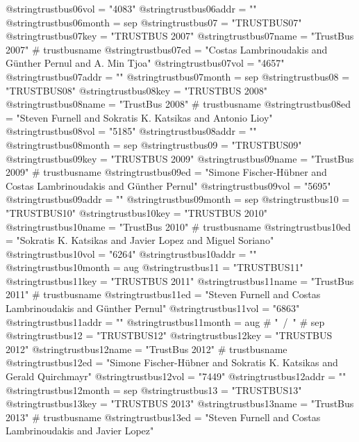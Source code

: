 @string{trustbus06vol =         "4083"}
@string{trustbus06addr =        ""}
@string{trustbus06month =       sep}
@string{trustbus07 =            "TRUSTBUS07"}
@string{trustbus07key =         "TRUSTBUS 2007"}
@string{trustbus07name =        "TrustBus 2007" # trustbusname}
@string{trustbus07ed =          "Costas Lambrinoudakis and G{\"u}nther Pernul and A. Min Tjoa"}
@string{trustbus07vol =         "4657"}
@string{trustbus07addr =        ""}
@string{trustbus07month =       sep}
@string{trustbus08 =            "TRUSTBUS08"}
@string{trustbus08key =         "TRUSTBUS 2008"}
@string{trustbus08name =        "TrustBus 2008" # trustbusname}
@string{trustbus08ed =          "Steven Furnell and Sokratis K. Katsikas and Antonio Lioy"}
@string{trustbus08vol =         "5185"}
@string{trustbus08addr =        ""}
@string{trustbus08month =       sep}
@string{trustbus09 =            "TRUSTBUS09"}
@string{trustbus09key =         "TRUSTBUS 2009"}
@string{trustbus09name =        "TrustBus 2009" # trustbusname}
@string{trustbus09ed =          "Simone Fischer-H{\"u}bner and Costas Lambrinoudakis and G{\"u}nther Pernul"}
@string{trustbus09vol =         "5695"}
@string{trustbus09addr =        ""}
@string{trustbus09month =       sep}
@string{trustbus10 =            "TRUSTBUS10"}
@string{trustbus10key =         "TRUSTBUS 2010"}
@string{trustbus10name =        "TrustBus 2010" # trustbusname}
@string{trustbus10ed =          "Sokratis K. Katsikas and Javier Lopez and Miguel Soriano"}
@string{trustbus10vol =         "6264"}
@string{trustbus10addr =        ""}
@string{trustbus10month =       aug}
@string{trustbus11 =            "TRUSTBUS11"}
@string{trustbus11key =         "TRUSTBUS 2011"}
@string{trustbus11name =        "TrustBus 2011" # trustbusname}
@string{trustbus11ed =          "Steven Furnell and Costas Lambrinoudakis and G{\"u}nther Pernul"}
@string{trustbus11vol =         "6863"}
@string{trustbus11addr =        ""}
@string{trustbus11month =       aug # "~/~" # sep}
@string{trustbus12 =            "TRUSTBUS12"}
@string{trustbus12key =         "TRUSTBUS 2012"}
@string{trustbus12name =        "TrustBus 2012" # trustbusname}
@string{trustbus12ed =          "Simone Fischer-H{\"u}bner and Sokratis K. Katsikas and Gerald Quirchmayr"}
@string{trustbus12vol =         "7449"}
@string{trustbus12addr =        ""}
@string{trustbus12month =       sep}
@string{trustbus13 =            "TRUSTBUS13"}
@string{trustbus13key =         "TRUSTBUS 2013"}
@string{trustbus13name =        "TrustBus 2013" # trustbusname}
@string{trustbus13ed =          "Steven Furnell and Costas Lambrinoudakis and Javier Lopez"}
